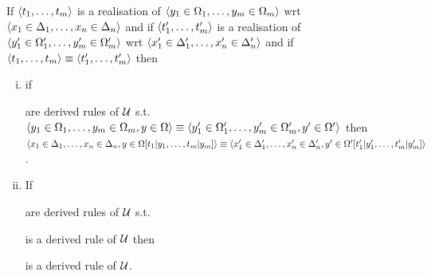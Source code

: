  \begin{lemma}
    If $\langle t_1, \dots, t_m \rangle$ is a realisation of $\langle y_1 \in \Omega_1, \dots, y_m \in \Omega_m \rangle$ wrt $\langle x_1 \in \Delta_1, \dots, x_n \in \Delta_n \rangle$ and if $\langle t'_1, \dots, t'_m \rangle$ is a realisation of $\langle y'_1 \in \Omega'_1, \dots, y'_m \in \Omega'_m \rangle$ wrt $\langle x'_1 \in \Delta'_1, \dots, x'_n \in \Delta'_n \rangle$ and if $\langle t_1, \dots, t_m \rangle \equiv \langle t'_1, \dots, t'_m \rangle$ then
    \begin{enumerate}[(i)]
      \item if
        are derived rules of $\mathcal{U}$ s.t.\ $\langle y_1 \in \Omega_1, \dots, y_m \in \Omega_m, y \in \Omega \rangle \equiv \langle y'_1 \in \Omega'_1, \dots, y'_m \in \Omega'_m, y' \in \Omega' \rangle$ then $\langle x_1 \in \Delta_1, \dots, x_n \in \Delta_n, y \in \Omega[t_1|y_1, \dots, t_m|y_m] \rangle \equiv \langle x'_1 \in \Delta'_1, \dots, x'_n \in \Delta'_n, y' \in \Omega'[t'_1|y'_1, \dots, t'_m|y'_m] \rangle$.

      \item If
        are derived rules of $\mathcal{U}$ s.t.\
        \begin{mathpar}
        \end{mathpar}
        is a derived rule of $\mathcal{U}$ then
        \begin{mathpar}
        \end{mathpar}
        is a derived rule of $\mathcal{U}$.
    \end{enumerate}
  \end{lemma}

